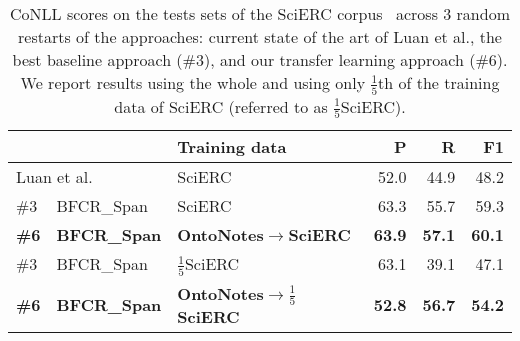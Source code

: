 \documentclass[runningheads]{llncs}
\begin{document}
\begin{table}[tb]
\centering
\small
\caption{CoNLL scores on the tests sets of the SciERC corpus~\cite{Luan2018MultiTaskIO} across 3 random restarts of the approaches: current state of the art of Luan et al., 
the best baseline approach (\#3), and our transfer learning approach (\#6). We report results using the whole and using only $\frac{1}{5}$th of the training data of SciERC (referred to as $\frac{1}{5}$SciERC).}
\label{tab:coref_results_scierc}
\begin{tabular}{lll|rrr}
  &           & Training data  & P       & R      & F1     \\ \hline
\multicolumn{2}{l}{ Luan et al.~\cite{Luan2018MultiTaskIO}} & SciERC 
 &  52.0 & 44.9 & 48.2 \\ \hline
\#3 & BFCR\_Span & SciERC 
 & 63.3	& 55.7	& 59.3 \\ 
\textbf{\#6} & \textbf{BFCR\_Span} & \textbf{OntoNotes$\rightarrow$SciERC}
& \textbf{63.9}	& \textbf{57.1}	& \textbf{60.1} \\
\hline
\#3 & BFCR\_Span & $\frac{1}{5}$SciERC 
& 63.1	& 39.1	& 47.1 \\
\textbf{\#6} & \textbf{BFCR\_Span} & \textbf{OntoNotes$\rightarrow \frac{1}{5}$SciERC} & \textbf{52.8}	& \textbf{56.7}	& \textbf{54.2} \\
\end{tabular}
\vspace{-1em}
\end{table}


\begin{comment}
\begin{table}[tb]
\centering
\small
\caption{
Per domain and overall performance results of the best transfer learning approach (\#6) on the test sets of the STM corpus across five-fold cross validation, i.e.
CoNLL precision (P), recall (R) and F1.}
\label{tab:results_per_domain}
\begin{tabular}{l|r|r|r|r|r|r|r|r|r|r|r}
   & Agr  & Ast  & Bio  & Che  & CS   & ES   & Eng  & MS   & Mat  & Med & Overall  \\ \hline
$CoNLL$ P & 65.5 & 57.5 & 53.4 & 60.8 & 82.4 & 62.1 & 60.7 & 53.1 & 53.5 & 66.2 & 62.0 \\
$CoNLL$ R & 60.9 & 66.4 & 63.5 & 53.6 & 69.1 & 55.8 & 59.9 & 54.1 & 61.3 & 59.2 & 61.0 \\
$CoNLL$ F1 & 62.8 & 61.1 & 57.5 & 56.3 & 74.9 & 57.5 & 59.8 & 52.1 & 55.7 & 62.1 & 61.4
\end{tabular}
\end{table}
\end{comment}
\end{document}
